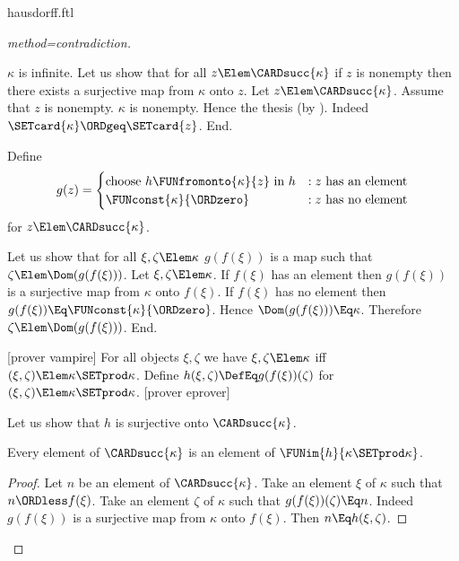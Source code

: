 \documentclass{stex}
\begin{document}
\begin{smodule}{hausdorff.ftl}
\begin{forthel}
\begin{proof}[method=contradiction]
\begin{case}{$\kappa$ is infinite.}
      Let us show that for all $z \Elem \CARDsucc{\kappa}$ if $z$ is nonempty then there exists a surjective map from $\kappa$ onto $z$.
        Let $z \Elem \CARDsucc{\kappa}$.
        Assume that $z$ is nonempty.
        $\kappa$ is nonempty.
        Hence the thesis (by ).
        Indeed $\SETcard{\kappa} \ORDgeq \SETcard{z}$.
      End.
  
      Define \[ g(z) =
        \begin{cases}
          \text{choose $h \FUNfromonto{\kappa}{z}$ in $h$}
          & : \text{$z$ has an element}
          \\
          \text{$\FUNconst{\kappa}{\ORDzero}$}
          & : \text{$z$ has no element}
        \end{cases}
      \] for $z \Elem \CARDsucc{\kappa}$.
  
      Let us show that for all $\xi, \zeta \Elem \kappa$ $g(f(\xi))$ is a map such that $\zeta \Elem\linebreak \Dom(g(f(\xi)))$.
        Let $\xi, \zeta \Elem \kappa$.
        If $f(\xi)$ has an element then $g(f(\xi))$ is a surjective map from $\kappa$ onto $f(\xi)$.
        If $f(\xi)$ has no element then $g(f(\xi)) \Eq\linebreak \FUNconst{\kappa}{\ORDzero}$.
        Hence $\Dom(g(f(\xi))) \Eq \kappa$.
        Therefore $\zeta \Elem \Dom(g(f(\xi)))$.
      End.
  
      [prover vampire]
      For all objects $\xi, \zeta$ we have $\xi, \zeta \Elem \kappa$ iff $(\xi, \zeta) \Elem \kappa \SETprod \kappa$.
      Define $h(\xi,\zeta) \DefEq g(f(\xi))(\zeta)$ for $(\xi,\zeta) \Elem \kappa \SETprod \kappa$.
      [prover eprover]

      Let us show that $h$ is surjective onto $\CARDsucc{\kappa}$.
  
        Every element of $\CARDsucc{\kappa}$ is an element of $\FUNim{h}{\kappa \SETprod \kappa}$.
        \begin{proof}
          Let $n$ be an element of $\CARDsucc{\kappa}$.
          Take an element $\xi$ of $\kappa$ such that $n \ORDless f(\xi)$.
          Take an element $\zeta$ of $\kappa$ such that $g(f(\xi))(\zeta) \Eq n$.
          Indeed $g(f(\xi))$ is a surjective map from $\kappa$ onto $f(\xi)$.
          Then $n \Eq h(\xi,\zeta)$.
        \end{proof}
  

\end{case}
\end{proof}
\end{forthel}
\end{smodule}
\end{document}

